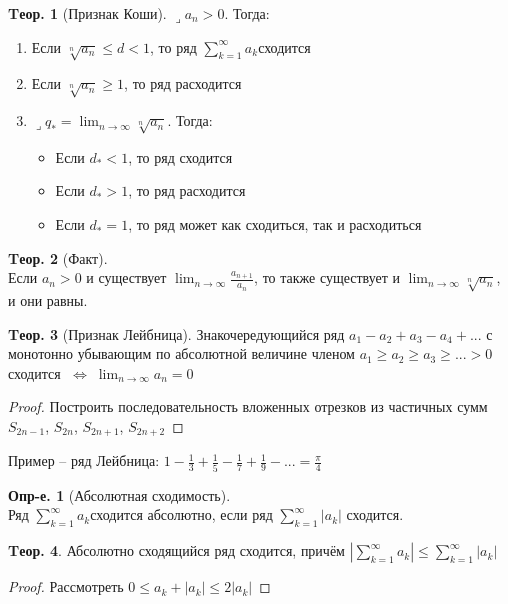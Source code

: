 \documentclass[a4paper,12pt]{article}
\numberwithin{figure}{section}
\theoremstyle{definition}
\newtheorem{definition}{Опр-е.}[section]
\theoremstyle{definition}
\newtheorem{theorem}{Tеор.}[section]
\def\DS{\displaystyle}
\def\ntoinf{n\to\infty}
\def\leqs{\leqslant}
\def\geqs{\geqslant}
\def\lets{{\huge$\lrcorner$}\space}
\def\iff{$\;\Longleftrightarrow\;$}
\def\rowak{$\DS\sum_{k=1}^{\infty}a_k$\space}
\begin{document}
\begin{theorem}[Признак Коши]
	\lets $a_n>0$. Тогда:
	\begin{enumerate}
		\item Если $\DS\sqrt[n]{a_n} \leqs d < 1$, то ряд \rowak сходится
		\item Если $\DS\sqrt[n]{a_n} \geqs 1$, то ряд расходится
		\item \lets $\DS q_* = \lim_{\ntoinf} \sqrt[n]{a_n}$. Тогда:
		\begin{itemize}
			\item Если $d_* < 1$, то ряд сходится
			\item Если $d_* > 1$, то ряд расходится
			\item Если $d_* = 1$, то ряд может как сходиться, так и расходиться
		\end{itemize}
	\end{enumerate}
\end{theorem}

\begin{theorem}[Факт] \ \\
	Если $a_n>0$ и существует $\DS \lim_{\ntoinf} \frac{a_{n+1}}{a_n}$,
	то также существует и $\DS \lim_{\ntoinf} \sqrt[n]{a_n}$, и они равны.
\end{theorem}
\bigskip

\begin{theorem}[Признак Лейбница]
	Знакочередующийся ряд $a_1 - a_2 + a_3 - a_4 + ...$
	с монотонно убывающим по абсолютной величине членом
	$a_1 \geqs a_2 \geqs a_3 \geqs ... > 0$
	сходится \iff $\DS \lim_{\ntoinf} a_n = 0$
\end{theorem}
\begin{proof}
	Построить последовательность вложенных отрезков из частичных сумм
	$S_{2n-1}$, $S_{2n}$, $S_{2n+1}$, $S_{2n+2}$
\end{proof}
\bigskip

Пример -- ряд Лейбница: $\DS 1-\frac13+\frac15-\frac17+\frac19-... = \frac\pi4$
\bigskip


\begin{definition}[Абсолютная сходимость] \ \\
	Ряд \rowak сходится абсолютно,
	если ряд $\DS\sum_{k=1}^{\infty}|a_k|$ сходится.
\end{definition}

\begin{theorem}
	Абсолютно сходящийся ряд сходится, причём
	$\DS \left|\sum_{k=1}^{\infty}a_k\right| \leqs \sum_{k=1}^{\infty}|a_k|$
\end{theorem}
\begin{proof} Рассмотреть $0 \leqs a_k + |a_k| \leqs 2|a_k|$ \end{proof}
\end{document}
